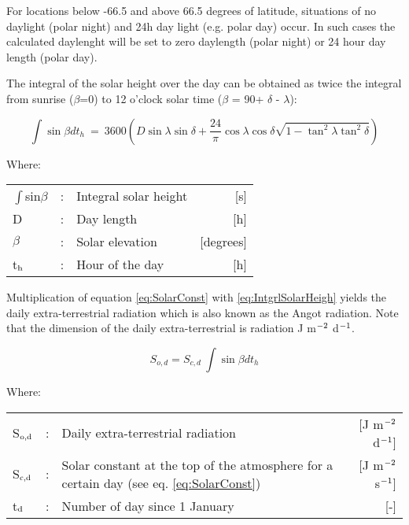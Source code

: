 For locations below -66.5 and above 66.5 degrees of latitude, situations of no daylight (polar night) 
and 24h day light (e.g. polar day) occur. In such cases the calculated daylenght will be set
to zero daylength (polar night) or 24 hour day length (polar day). 

The integral of the solar height over the day can be obtained as twice the integral from
sunrise ($\beta$=0\degrees ) to 12 o'clock solar time ($\beta$ = 90\degrees  + $\delta$ - $\lambda$):

\begin{equation}
\label{eq:IntgrlSolarHeigh}
\int \sin \beta dt _{h} ~=~ 3600( D \sin \lambda \sin \delta +{\frac{24}{\pi }} \cos \lambda \cos \delta \sqrt{1-\tan^{2} \lambda \tan^{2} \delta } )
\end{equation}

Where:\\[5pt]
\begin{tabularx}{\textwidth}{llXr}
	$\int$sin$\beta$  &:& Integral solar height & [s]\\
	D  &:& Day length & [h]\\
	$\beta$  &:& Solar elevation & [degrees]\\
	t$_{{\rm h}}$  &:& Hour of the day & [h]\\
\end{tabularx}

Multiplication of equation \ref{eq:SolarConst} with \ref{eq:IntgrlSolarHeigh} yields the 
daily extra-terrestrial radiation which is also known as the Angot radiation. Note that 
the dimension of the daily extra-terrestrial is radiation J m$^{{\rm -2}}$ d$^{{\rm -1}}$.

\begin{equation}
\label{eq:Angot}
S_{o,d} = S _{c,d} ~ \int \sin \beta dt _{h} 
\end{equation}

Where:\\[5pt]
\begin{tabularx}{\textwidth}{llXr}
	S$_{{\rm o,d}}$ &:& Daily extra-terrestrial radiation  & [J m$^{{\rm -2}}$ d$^{{\rm -1}}$]\\
	S$_{{\rm c,d}}$ &:& Solar constant at the top of the atmosphere 
	for a certain day (see eq. \ref{eq:SolarConst})  & [J m$^{{\rm -2}}$ s$^{{\rm -1}}$]\\
	t$_{{\rm d}}$ &:& Number of day since 1 January  & [-]\\
\end{tabularx}


